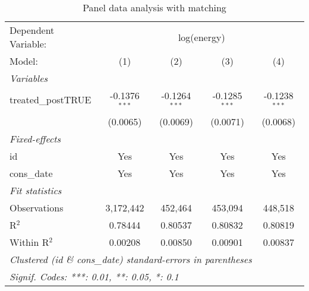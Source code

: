 
\begin{table}[htbp]
   \centering
   \caption{Panel data analysis with matching\label{tab:didmatch}}
   \begin{tabular}{lcccc}
      \tabularnewline\midrule\midrule
      Dependent Variable: & \multicolumn{4}{c}{log(energy)}\\
      Model:             & (1)             & (2)             & (3)             & (4)\\
      \midrule \emph{Variables} &   &   &   &  \\
      treated\_postTRUE & -0.1376$^{***}$ & -0.1264$^{***}$ & -0.1285$^{***}$ & -0.1238$^{***}$\\
                         & (0.0065)        & (0.0069)        & (0.0071)        & (0.0068)\\
      \midrule \emph{Fixed-effects} &   &   &   &  \\
      id                 & Yes             & Yes             & Yes             & Yes\\
      cons\_date        & Yes             & Yes             & Yes             & Yes\\
      \midrule \emph{Fit statistics} &   &   &   &  \\
      Observations       & 3,172,442       & 452,464         & 453,094         & 448,518\\
      R$^2$              & 0.78444         & 0.80537         & 0.80832         & 0.80819\\
      Within R$^2$       & 0.00208         & 0.00850         & 0.00901         & 0.00837\\
      \midrule\midrule\multicolumn{5}{l}{\emph{Clustered (id \& cons\_date) standard-errors in parentheses}}\\
      \multicolumn{5}{l}{\emph{Signif. Codes: ***: 0.01, **: 0.05, *: 0.1}}\\
   \end{tabular}
\end{table}


